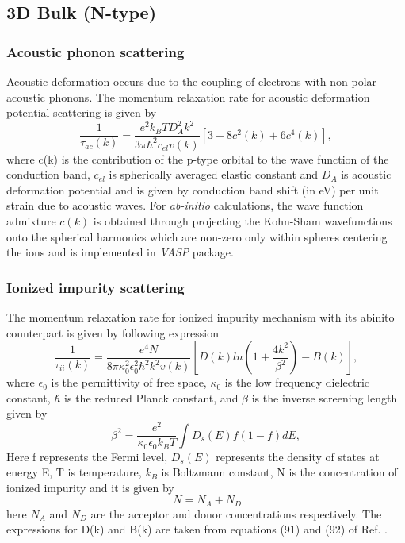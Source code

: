 \documentclass[12pt]{article}
\begin{document}
\subsection{3D Bulk (N-type)}

\subsubsection{Acoustic phonon scattering}

Acoustic deformation occurs due to the coupling of electrons with non-polar acoustic phonons. The momentum relaxation rate for acoustic deformation potential scattering is given by \cite{rode1}
\begin{equation}
\frac{1}{\tau_{ac}(k)} = \frac{e^2 k_B T D_A^2 k^2}{3\pi\hbar^2 c_{el}v(k)}[3 - 8c^2(k)+6c^4(k)] ,
\label{acoustic deformation}
\end{equation}
where c(k) is the contribution of the p-type orbital to the wave function of the conduction band, $c_{el}$ is spherically averaged elastic constant and $D_A$ is acoustic deformation potential and is given by conduction band shift (in eV) per unit strain due to acoustic waves.  For \textit{ab-initio} calculations, the wave function admixture $c(k)$ is obtained through projecting the Kohn-Sham wavefunctions onto the spherical harmonics which are non-zero only within spheres centering the ions and is implemented in \textsl{VASP} package. \\

\subsubsection{Ionized impurity scattering}
The momentum relaxation rate for ionized impurity mechanism with its abinito counterpart is given by following expression \cite{anup1}
\begin{equation}
\frac{1}{\tau_{ii}(k)} = \frac{e^4 N }{8\pi \kappa_0^2 \epsilon_0^2\hbar^2 k^2 v(k)}[D(k)ln(1+\frac{4k^2}{\beta^2})-B(k)] ,
\label{Ionized impurity}
\end{equation}
where $\epsilon_0$ is the permittivity of free space, $\kappa_0$ is the low frequency dielectric constant, $\hbar$ is the reduced Planck constant, and $\beta$ is the inverse screening length given by
\begin{equation}
\beta^2 = \frac{e^2}{\kappa_0 \epsilon_0 k_B T}\int D_s(E) f(1-f)dE,
\label{beta square}
\end{equation}
Here f represents the Fermi level, $D_s(E)$ represents the density of states at energy E, T is temperature, $k_B$ is Boltzmann constant, N is the concentration of ionized impurity and it is given by
\begin{equation}
\ N = N_A + N_D
\label{impurity}
\end{equation} 
here $N_A$ and $N_D$ are the acceptor and donor concentrations respectively. The expressions for D(k) and B(k) are taken from equations (91) and (92) of Ref. \cite{rode1}. \\
\end{document}
